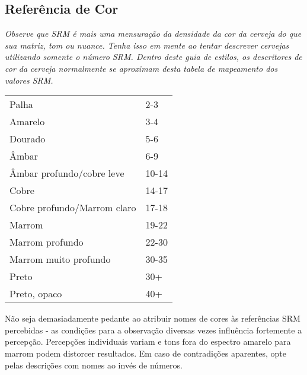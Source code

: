 \subsection*{Referência de Cor}
\textit{Observe que SRM é mais uma mensuração da densidade da cor da cerveja do que sua matriz, tom ou nuance. Tenha isso em mente ao tentar descrever cervejas utilizando somente o número SRM. Dentro deste guia de estilos, os descritores de cor da cerveja normalmente se aproximam desta tabela de mapeamento dos valores SRM.}

\begin{tabular}{ l l }
Palha & 2-3 \\
Amarelo & 3-4 \\
Dourado & 5-6 \\
Âmbar & 6-9 \\
Âmbar profundo/cobre leve & 10-14 \\
Cobre & 14-17 \\
Cobre profundo/Marrom claro & 17-18 \\
Marrom & 19-22 \\
Marrom profundo & 22-30 \\
Marrom muito profundo & 30-35 \\
Preto & 30+ \\
Preto, opaco & 40+
\end{tabular}

Não seja demasiadamente pedante ao atribuir nomes de cores às referências SRM percebidas - as condições para a observação diversas vezes influência fortemente a percepção. Percepções individuais variam e tons fora do espectro amarelo para marrom podem distorcer resultados. Em caso de contradições aparentes, opte pelas descrições com nomes ao invés de números.
